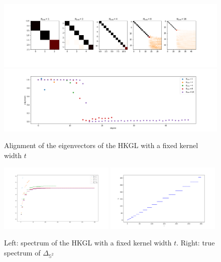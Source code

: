 \begin{figure}[h!]
	\centering
	\includegraphics[width=\textwidth]{../codes/02.HeatKernelGraphLaplacian/HEALPix/06_figures/n.png}
	\includegraphics[width=\textwidth]{../codes/02.HeatKernelGraphLaplacian/HEALPix/06_figures/n_diagonal.png}	
	\caption{\label{fig:n to infinity1}Alignment of the eigenvectors of the HKGL with a fixed kernel width $t$}
	
\end{figure}
\begin{figure}[h!]
	\centering
	\includegraphics[width=0.49\textwidth]{../codes/02.HeatKernelGraphLaplacian/HEALPix/06_figures/n_eigenvalues.png}
		\includegraphics[width=0.49\textwidth]{figs/chapter1/trueeigenvalues.png}	
	\caption{\label{fig:n to infinity3}Left: spectrum of the HKGL with a fixed kernel width $t$. Right: true spectrum of $\Delta_{\mathbb S^2}$}
\end{figure}

